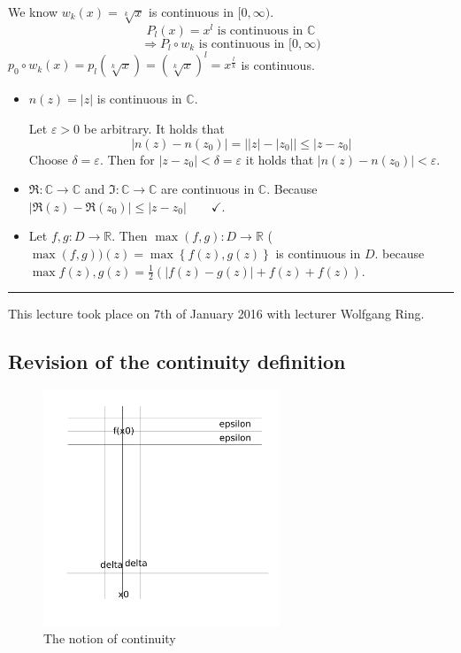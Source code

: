 \documentclass[a4paper,landscape,twocolumn]{article}
\newcommand\set[1]{\left\{#1\right\}}
\newcommand\abs[1]{\left|#1\right|}
\newcommand\meta[3]{\hrule{} This #1 took place on #2 with lecturer #3.\par}
\begin{document}
We know $w_k(x) = \sqrt[k]{x}$ is continuous in $[0,\infty)$.
\[ P_l(x) = x^l \text{ is continuous in } \mathbb C \]
\[ \Rightarrow P_l \circ w_k \text{ is continuous in } [0,\infty) \]
$p_0 \circ w_k (x) = p_l(\sqrt[k]{x}) = \left(\sqrt[k]{x}\right)^l = x^{\frac lk}$ is continuous.

\begin{itemize}
  \item $n(z) = \abs{z}$ is continuous in $\mathbb C$.

    Let $\varepsilon > 0$ be arbitrary. It holds that
    \[ \abs{n(z) - n(z_0)} = \abs{\abs{z} - \abs{z_0}} \leq \abs{z - z_0} \]
    Choose $\delta = \varepsilon$. Then for $\abs{z - z_0} < \delta = \varepsilon$ it holds
    that $\abs{n(z) - n(z_0)} < \varepsilon$.
  \item $\Re: \mathbb C \to \mathbb C$ and $\Im: \mathbb C \to \mathbb C$ are continuous in $\mathbb C$.
    Because $\abs{\Re(z) - \Re(z_0)} \leq \abs{z - z_0} \qquad \checkmark$.
  \item
    Let $f, g: D \to \mathbb R$. Then $\max(f, g): D \rightarrow \mathbb R$
    ($\max(f, g))(z) = \max\set{f(z), g(z)}$ is continuous in $D$.
    because $\max{f(z), g(z)} = \frac12 \left(\abs{f(z) - g(z)} + f(z) + f(z)\right)$.
\end{itemize}

\meta{lecture}{7th of January 2016}{Wolfgang Ring}

\subsection{Revision of the continuity definition}

\begin{figure}[!h]
  \begin{center}
    \includegraphics[width=200pt]{img/continuity_revised.pdf}
    \caption{The notion of continuity}
  \end{center}
\end{figure}
\end{document}

